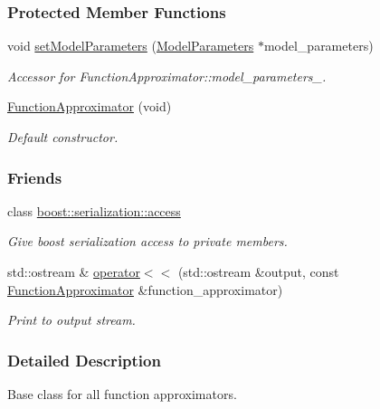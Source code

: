 \subsubsection*{Protected Member Functions}
\begin{DoxyCompactItemize}
\item 
void \hyperlink{classDmpBbo_1_1FunctionApproximator_afd6f9d480456b90c4740c7aaca084ba4}{set\+Model\+Parameters} (\hyperlink{classDmpBbo_1_1ModelParameters}{Model\+Parameters} $\ast$model\+\_\+parameters)
\begin{DoxyCompactList}\small\item\em Accessor for Function\+Approximator\+::model\+\_\+parameters\+\_\+. \end{DoxyCompactList}\item 
\hyperlink{classDmpBbo_1_1FunctionApproximator_a1d3363a4408af30b1251cbf7b4588f87}{Function\+Approximator} (void)
\begin{DoxyCompactList}\small\item\em Default constructor. \end{DoxyCompactList}\end{DoxyCompactItemize}
\subsubsection*{Friends}
\begin{DoxyCompactItemize}
\item 
class \hyperlink{classDmpBbo_1_1FunctionApproximator_ac98d07dd8f7b70e16ccb9a01abf56b9c}{boost\+::serialization\+::access}
\begin{DoxyCompactList}\small\item\em Give boost serialization access to private members. \end{DoxyCompactList}\item 
std\+::ostream \& \hyperlink{classDmpBbo_1_1FunctionApproximator_a07e49b4e5e386d6923f0fd558c77b8b4}{operator$<$$<$} (std\+::ostream \&output, const \hyperlink{classDmpBbo_1_1FunctionApproximator}{Function\+Approximator} \&function\+\_\+approximator)
\begin{DoxyCompactList}\small\item\em Print to output stream. \end{DoxyCompactList}\end{DoxyCompactItemize}


\subsubsection{Detailed Description}
Base class for all function approximators. 

